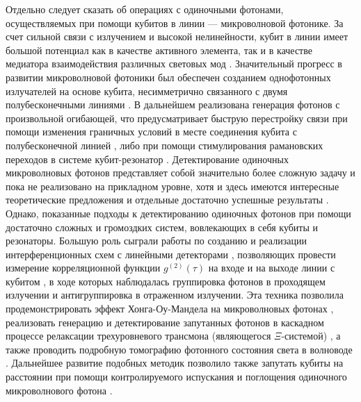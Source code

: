 Отдельно следует сказать об операциях с одиночными фотонами, осуществляемых при помощи кубитов в линии --- микроволновой фотонике. За счет сильной связи с излучением и высокой нелинейности, кубит в линии имеет большой потенциал как в качестве активного элемента, так и в качестве медиатора взаимодействия различных световых мод \cite[]{Strongly1D}. Значительный прогресс в развитии микроволновой фотоники был обеспечен созданием однофотонных излучателей на основе кубита, несимметрично связанного с двумя полубесконечными линиями \cite{peng2016tuneable,Shaped_SPS,Pechal2016switch,ZhouHighEfficiency}. В дальнейшем реализована генерация фотонов с произвольной огибающей,  что предусматривает быструю перестройку связи при помощи изменения граничных условий в месте соединения кубита с полубесконечной линией \cite[]{Shaped_SPS}, либо при помощи стимулирования рамановских переходов в системе кубит-резонатор \cite{PechalShaped}. Детектирование одиночных микроволновых фотонов представляет собой значительно более сложную задачу и пока не реализовано на прикладном уровне, хотя и здесь имеются интересные теоретические предложения \cite{grimsmo2020quantum} и отдельные достаточно успешные результаты \cite{kono2018quantum,BesseQNDphoton}. Однако, показанные подходы к детектированию одиночных фотонов при помощи достаточно сложных и громоздких систем, вовлекающих в себя кубиты и резонаторы. Большую роль сыграли работы по созданию и реализации интерференционных схем с линейными детекторами \cite{daSilvaSchemes}, позволяющих провести измерение корреляционной функции $g^{(2)}(\tau)$ на входе и на выходе линии с кубитом \cite{hoi2012generation}, в ходе которых наблюдалась группировка фотонов в проходящем излучении и антигруппировка в отраженном излучении. Эта техника позволила продемонстрировать эффект Хонга-Оу-Мандела на микроволновых фотонах \cite{lang2013correlations}, реализовать генерацию и детектирование запутанных фотонов в каскадном процессе релаксации трехуровневого трансмона (являющегося $\Xi$-системой) \cite{Wallraff_entangledPhotons}, а также проводить подробную томографию фотонного состояния света в волноводе \cite{EichlerTomography}. Дальнейшее развитие подобных методик позволило также запутать кубиты на расстоянии при помощи контролируемого испускания и поглощения одиночного микроволнового фотона \cite[]{kurpiers2018deterministic}.

